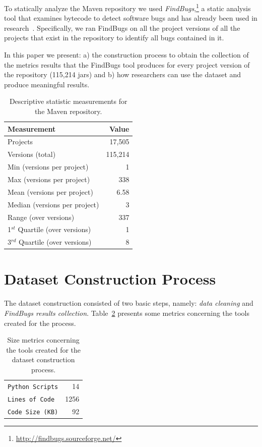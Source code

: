 \documentclass{sig-alternate}
\begin{document}
To statically analyze the Maven repository
we used {\it FindBugs},\footnote{\url{http://findbugs.sourceforge.net/}}
a static analysis tool that examines bytecode to detect software bugs
and has already been used in research~\cite{AP10,SHP06}.
Specifically, we ran FindBugs on all the project versions of all
the projects that exist in the repository
to identify all bugs contained in it.

In this paper we present: a) the construction process to obtain the
collection of the metrics results that the FindBugs tool produces 
for every project version of the repository (115,214 {\sc jar}s)
and b) how researchers can use the dataset and produce
meaningful results.

\begin{table}
\centering
\begin{tabular}{l r}
\hline
Measurement & Value\\
 \hline
Projects & 17,505\\
Versions (total) & 115,214\\
Min (versions per project) & 1\\
Max (versions per project) & 338\\
Mean (versions per project) & 6.58\\
Median (versions per project) & 3\\
Range (over versions) & 337\\
1$^{st}$ Quartile (over versions) & 1\\
3$^{rd}$ Quartile (over versions) & 8\\
\hline
\end{tabular}
\caption{Descriptive statistic measurements for the Maven repository.}
\label{tbl:repository}
\end{table}

\section{Dataset Construction Process}
\label{sec:exp}

The dataset construction consisted of two basic steps,
namely: {\it data cleaning} and {\it FindBugs results
collection}. Table~\ref{tbl:tools-size} presents some
metrics concerning the tools created for
the process.

\begin{table}
\centering
\begin{tabular}{l r}
 \hline
\verb|Python Scripts| & 14\\
\verb|Lines of Code| & 1256\\
\verb|Code Size (KB)| & 92\\
\hline
\end{tabular}
\caption{Size metrics concerning
the tools created for
the dataset construction process.}
\label{tbl:tools-size}
\end{table}
\end{document}
